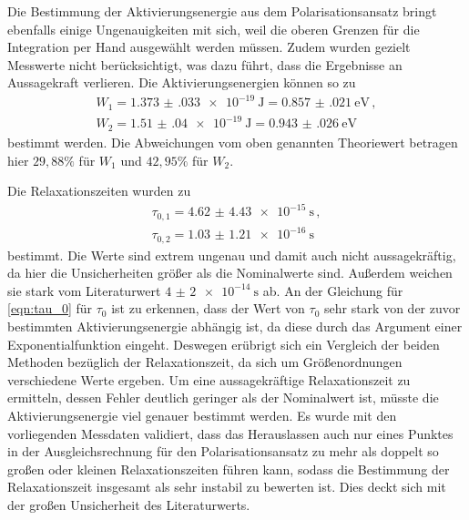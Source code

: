 Die Bestimmung der Aktivierungsenergie aus dem Polarisationsansatz bringt ebenfalls
einige Ungenauigkeiten mit sich, weil die oberen Grenzen für die Integration per Hand
ausgewählt werden müssen. Zudem wurden gezielt Messwerte nicht berücksichtigt, was
dazu führt, dass die Ergebnisse an Aussagekraft verlieren. Die Aktivierungsenergien
können so zu
\begin{align*}
	W_1=\SI{1.373(033)e-19}{\joule}=\SI{0.857(021)}{\eV} \,, \\
	W_2=\SI{1.51(04)e-19}{\joule}=\SI{0.943(026)}{\eV} \,
\end{align*}
bestimmt werden.
Die Abweichungen vom oben genannten Theoriewert betragen hier
$29{,}88\%$ für $W_1$ und $42{,}95\%$ für $W_2$.

Die Relaxationszeiten wurden zu
\begin{align*}
	\tau_{0,1}=\SI{4.62(443)e-15}{\second} \,, \\
	\tau_{0,2}=\SI{1.03(121)e-16}{\second} \,
\end{align*}
bestimmt. Die Werte sind extrem ungenau und damit auch nicht aussagekräftig, da hier die Unsicherheiten größer
als die Nominalwerte sind. Außerdem weichen sie stark vom Literaturwert  $\SI{4(2)e-14}{\second}$
ab. An der Gleichung für \eqref{eqn:tau_0} für $\tau_0$ ist zu erkennen, dass der Wert von $\tau_0$ sehr stark von der zuvor bestimmten Aktivierungsenergie abhängig ist, da diese durch das Argument einer Exponentialfunktion eingeht. Deswegen erübrigt sich ein Vergleich der beiden Methoden bezüglich der Relaxationszeit, da sich um Größenordnungen verschiedene Werte ergeben. Um eine aussagekräftige Relaxationszeit zu ermitteln, dessen Fehler deutlich geringer als der Nominalwert ist, müsste die Aktivierungsenergie viel genauer bestimmt werden. Es wurde mit den vorliegenden Messdaten validiert, dass das Herauslassen auch nur eines Punktes in der Ausgleichsrechnung für den Polarisationsansatz zu mehr als doppelt so großen oder kleinen Relaxationszeiten führen kann, sodass die Bestimmung der Relaxationszeit insgesamt als sehr instabil zu bewerten ist. Dies deckt sich mit der großen Unsicherheit des Literaturwerts.
